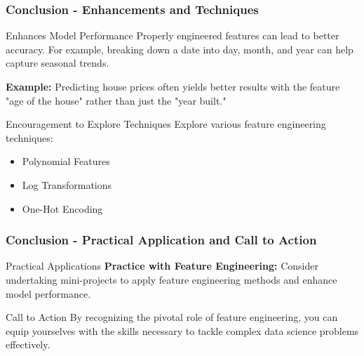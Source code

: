 \documentclass[aspectratio=169]{beamer}
\begin{document}
\begin{frame}[fragile]
    \frametitle{Conclusion - Enhancements and Techniques}
    \begin{block}{Enhances Model Performance}
        Properly engineered features can lead to better accuracy. For example, breaking down a date into day, month, and year can help capture seasonal trends.
    
        \textbf{Example:} Predicting house prices often yields better results with the feature "age of the house" rather than just the "year built."
    \end{block}
    
    \begin{block}{Encouragement to Explore Techniques}
        Explore various feature engineering techniques:
        \begin{itemize}
            \item Polynomial Features
            \item Log Transformations
            \item One-Hot Encoding
        \end{itemize}
    \end{block}
\end{frame}

\begin{frame}[fragile]
    \frametitle{Conclusion - Practical Application and Call to Action}
    \begin{block}{Practical Applications}
        \textbf{Practice with Feature Engineering:}
        Consider undertaking mini-projects to apply feature engineering methods and enhance model performance.
    \end{block}
    
    \begin{block}{Call to Action}
        By recognizing the pivotal role of feature engineering, you can equip yourselves with the skills necessary to tackle complex data science problems effectively.
    \end{block}
\end{frame}
\end{document}

